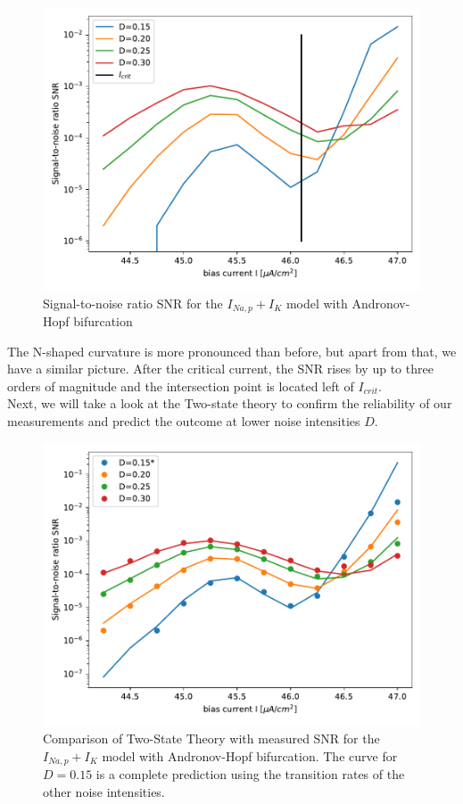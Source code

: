\documentclass[12pt,a4paper]{article}
\begin{document}
\begin{figure}[H]
	\centering
	\includegraphics[scale=1]{snranhopfcrit2.pdf}\caption{Signal-to-noise ratio SNR for the $I_{Na,p}+I_K$ model with Andronov-Hopf bifurcation}
	\label{specanhopf}
\end{figure}
The N-shaped curvature is more pronounced than before, but apart from that, we have a similar picture. After the critical current, the SNR rises by up to three orders of magnitude and the intersection point is located left of $I_{crit}$. 
\\
Next, we will take a look at the Two-state theory to confirm the reliability of our measurements and predict the outcome at lower noise intensities $D$.
\begin{figure}[H]
	\centering
	\includegraphics[scale=1]{snrtwostatecompanhopf7mnofit4.pdf}\caption{Comparison of Two-State Theory with measured SNR for the $I_{Na,p}+I_K$ model with Andronov-Hopf bifurcation. The curve for $D=0.15$ is a complete prediction using the transition rates of the other noise intensities.}
 	\label{specanhopftst}
\end{figure}
\end{document}

